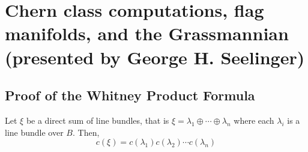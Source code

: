 \documentclass[11pt,leqno,oneside]{amsbook}
\numberwithin{thm}{section}
\begin{document}
\section{Chern class computations, flag manifolds, and the
  Grassmannian (presented by George H. Seelinger)}
\subsection{Proof of the Whitney Product Formula}
\begin{lem}\label{whitney-product-formula-on-line-bundles}
  Let \(\xi\) be a direct sum of line bundles, that is \(\xi =
  \lambda_1 \oplus \cdots \oplus \lambda_n\) where each \(\lambda_i\)
  is a line bundle over \(B\). Then, \[
    c(\xi) = c(\lambda_1) c(\lambda_2) \cdots c(\lambda_n)
  \]
\end{lem}
\end{document}
